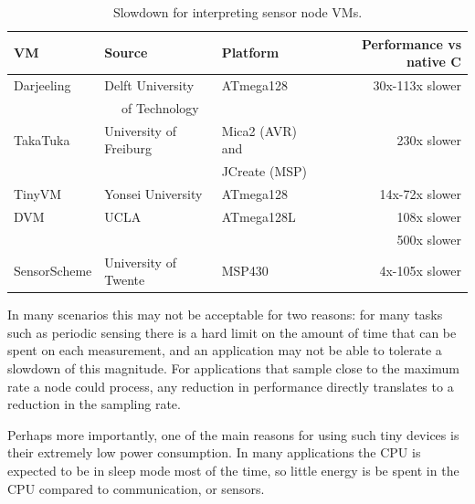 \begin{table}
\caption{Slowdown for interpreting sensor node VMs.}
\label{tbl-slowdown-for-sensornode-vms}
    \begin{tabular}{lllr}
    \toprule
    VM              & Source                           & Platform                   & Performance vs native C \\
    \midrule
    \midrule
    Darjeeling      & Delft University                 & ATmega128                  & 30x-113x slower \cite{Brouwers:2009cj} \\
                    & ~~ of Technology                 &                            & \\
    TakaTuka        & University of Freiburg           & Mica2 (AVR) and            & 230x slower \cite{Ellul:2012thesis} \\
                    &                                  & JCreate (MSP)                           & \\
    TinyVM          & Yonsei University                & ATmega128                  & 14x-72x slower \cite{Hong:2009gc} \\
    DVM             & UCLA                             & ATmega128L                 & 108x slower \cite{Balani:2006} \\
                    &                                  &                            & 500x slower \cite{Kumar:2007ge} \\
    SensorScheme    & University of Twente             & MSP430                     & 4x-105x slower \cite{Evers:2010ur} \\
    \bottomrule
    \end{tabular}
\end{table}

In many scenarios this may not be acceptable for two reasons: for many tasks such as periodic sensing there is a hard limit on the amount of time that can be spent on each measurement, and an application may not be able to tolerate a slowdown of this magnitude. For applications that sample close to the maximum rate a node could process, any reduction in performance directly translates to a reduction in the sampling rate.

Perhaps more importantly, one of the main reasons for using such tiny devices is their extremely low power consumption. In many applications the CPU is expected to be in sleep mode most of the time, so little energy is be spent in the CPU compared to communication, or sensors.

